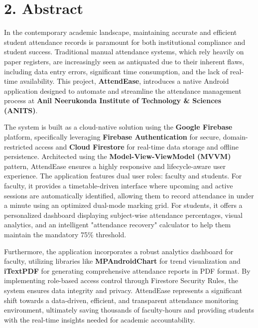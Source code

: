 \documentclass[12pt,a4paper]{report}
\begin{document}

\chapter*{2. Abstract}

In the contemporary academic landscape, maintaining accurate and efficient student attendance records is paramount for both institutional compliance and student success. Traditional manual attendance systems, which rely heavily on paper registers, are increasingly seen as antiquated due to their inherent flaws, including data entry errors, significant time consumption, and the lack of real-time availability. This project, \textbf{AttendEase}, introduces a native Android application designed to automate and streamline the attendance management process at \textbf{Anil Neerukonda Institute of Technology \& Sciences (ANITS)}.

The system is built as a cloud-native solution using the \textbf{Google Firebase} platform, specifically leveraging \textbf{Firebase Authentication} for secure, domain-restricted access and \textbf{Cloud Firestore} for real-time data storage and offline persistence. Architected using the \textbf{Model-View-ViewModel (MVVM)} pattern, AttendEase ensures a highly responsive and lifecycle-aware user experience. The application features dual user roles: faculty and students. For faculty, it provides a timetable-driven interface where upcoming and active sessions are automatically identified, allowing them to record attendance in under a minute using an optimized dual-mode marking grid. For students, it offers a personalized dashboard displaying subject-wise attendance percentages, visual analytics, and an intelligent "attendance recovery" calculator to help them maintain the mandatory 75\% threshold.

Furthermore, the application incorporates a robust analytics dashboard for faculty, utilizing libraries like \textbf{MPAndroidChart} for trend visualization and \textbf{iTextPDF} for generating comprehensive attendance reports in PDF format. By implementing role-based access control through Firestore Security Rules, the system ensures data integrity and privacy. AttendEase represents a significant shift towards a data-driven, efficient, and transparent attendance monitoring environment, ultimately saving thousands of faculty-hours and providing students with the real-time insights needed for academic accountability.
\end{document}
